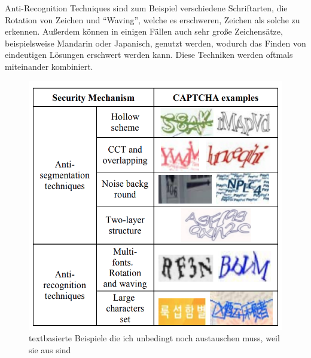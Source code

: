 Anti-Recognition Techniques sind zum Beispiel verschiedene Schriftarten, die Rotation von Zeichen und ``Waving'', 
welche es erschweren, Zeichen als solche zu erkennen. 
Außerdem können in einigen Fällen auch sehr große Zeichensätze, beispielsweise Mandarin oder Japanisch, genutzt werden, 
wodurch das Finden von eindeutigen Lösungen erschwert werden kann.
Diese Techniken werden oftmals miteinander kombiniert.
\cite{surveyofresearch}

\begin{figure}
    \centering
    \includegraphics{gfx/mygraphics/unbedingtaustauschen1.png}
    \caption{textbasierte Beispiele die ich unbedingt noch austauschen muss, weil sie aus \cite{surveyofresearch} sind}
\end{figure}

